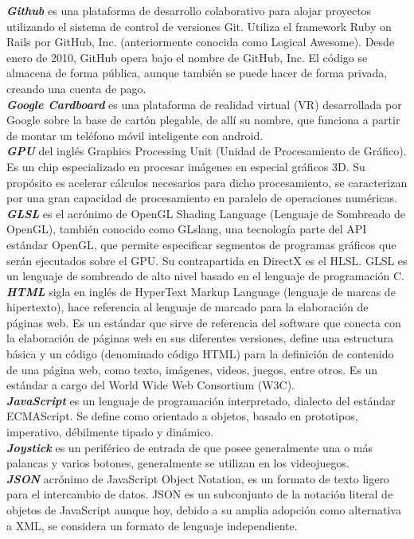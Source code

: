 \documentclass[12pt]{article}
\begin{document}
\textbf{\textit{Github}} es una plataforma de desarrollo colaborativo para alojar proyectos utilizando el sistema de control de versiones Git. Utiliza el framework Ruby on Rails por GitHub, Inc. (anteriormente conocida como Logical Awesome). Desde enero de 2010, GitHub opera bajo el nombre de GitHub, Inc. El código se almacena de forma pública, aunque también se puede hacer de forma privada, creando una cuenta de pago.\\
\textbf{\textit{Google Cardboard}} es una plataforma de realidad virtual (VR) desarrollada por Google sobre la base de cartón plegable, de allí su nombre, que funciona a partir de montar un teléfono móvil inteligente con android.\\
\textbf{\textit{GPU}} del inglés Graphics Processing Unit (Unidad de Procesamiento de Gráfico). Es un chip especializado en procesar imágenes en especial gráficos 3D. Su propósito es acelerar cálculos necesarios para dicho procesamiento, se caracterizan por una gran capacidad de procesamiento en paralelo de operaciones numéricas.\\
\textbf{\textit{GLSL}}  es el acrónimo de OpenGL Shading Language (Lenguaje de Sombreado de OpenGL), también conocido como GLslang, una tecnología parte del API estándar OpenGL, que permite especificar segmentos de programas gráficos que serán ejecutados sobre el GPU. Su contrapartida en DirectX es el HLSL. GLSL es un lenguaje de sombreado de alto nivel basado en el lenguaje de programación C.\\
\textbf{\textit{HTML}}  sigla en inglés de HyperText Markup Language (lenguaje de marcas de hipertexto), hace referencia al lenguaje de marcado para la elaboración de páginas web. Es un estándar que sirve de referencia del software que conecta con la elaboración de páginas web en sus diferentes versiones, define una estructura básica y un código (denominado código HTML) para la definición de contenido de una página web, como texto, imágenes, videos, juegos, entre otros. Es un estándar a cargo del World Wide Web Consortium (W3C).\\
\textbf{\textit{JavaScript}} es un lenguaje de programación interpretado, dialecto del estándar ECMAScript. Se define como orientado a objetos, basado en prototipos, imperativo, débilmente tipado y dinámico.\\
\textbf{\textit{Joystick}} es un periférico de entrada de que posee generalmente una o más palancas y varios botones, generalmente se utilizan en los videojuegos.\\
\textbf{\textit{JSON}} acrónimo de JavaScript Object Notation, es un formato de texto ligero para el intercambio de datos. JSON es un subconjunto de la notación literal de objetos de JavaScript aunque hoy, debido a su amplia adopción como alternativa a XML, se considera un formato de lenguaje independiente.\\
\end{document}
